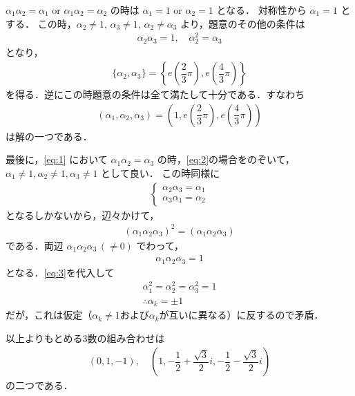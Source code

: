 \documentclass[../../main.tex]{subfiles}
\begin{document}
$\alpha_1 \alpha_2 = \alpha_1$ or $\alpha_1 \alpha_2 = \alpha_2$ の時は $\alpha_1 = 1$ or $\alpha_2 = 1$ となる．
対称性から $\alpha_1 = 1$ とする．
この時，$\alpha_2 \ne 1, \, \alpha_3 \ne 1, \, \alpha_2 \ne \alpha_3$ より，題意のその他の条件は
\begin{align}
  \alpha_2 \alpha_3 = 1, \quad \alpha_2^2 = \alpha_3
\end{align}
となり，
\begin{align}
  \{ \alpha_2, \alpha_3 \} = \left\{ e\left(\dfrac{2}{3}\pi\right), e\left(\dfrac{4}{3}\pi\right) \right\}
\end{align}
を得る．逆にこの時題意の条件は全て満たして十分である．すなわち
\begin{align}
  \left(\alpha_1,\alpha_2,\alpha_3\right) = \left(1, e\left(\dfrac{2}{3}\pi\right), e\left(\dfrac{4}{3}\pi\right) \right) \label{eq:2}
\end{align}
は解の一つである．

最後に，\cref{eq:1} において $\alpha_1 \alpha_2 = \alpha_3$ の時，\cref{eq:2}の場合をのぞいて，$\alpha_1 \ne 1, \alpha_2 \ne 1, \alpha_3 \ne 1$ として良い．
この時同様に
\begin{align}
  \begin{cases}
    \alpha_2 \alpha_3 = \alpha_1 \\
    \alpha_3 \alpha_1 = \alpha_2
  \end{cases} \label{eq:3}
\end{align}
となるしかないから，辺々かけて，
\begin{align}
  \left(\alpha_1\alpha_2\alpha_3\right)^2 =  \left(\alpha_1\alpha_2\alpha_3\right)
\end{align}
である．両辺 $\alpha_1 \alpha_2 \alpha_3\, (\neq 0)$ でわって，
\begin{align}
  \alpha_1 \alpha_2 \alpha_3 = 1
\end{align}
となる．\cref{eq:3}を代入して
\begin{align}
  \alpha_1^2 = \alpha_2^2 = \alpha_3^2 = 1 \\
  \therefore
  \alpha_k = \pm 1
\end{align}
だが，これは仮定（$\alpha_k \neq 1$および$\alpha_k$が互いに異なる）に反するので矛盾．
\casesend

以上よりもとめる3数の組み合わせは
\begin{align}
  (0, 1, -1), \quad \left(1, -\dfrac{1}{2}+\dfrac{\sqrt{3}}{2}i, -\dfrac{1}{2}-\dfrac{\sqrt{3}}{2}i\right)
\end{align}
の二つである．
\end{document}
